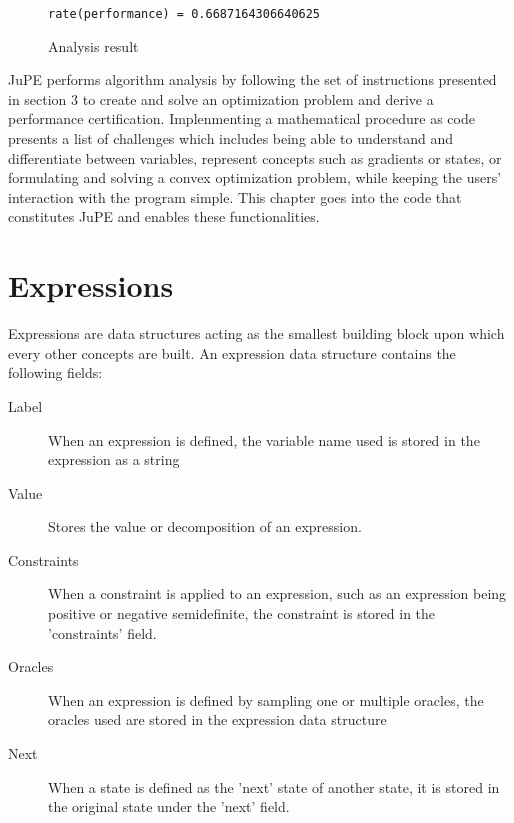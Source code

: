 \begin{figure}[hbtp]
    \caption{Analysis result}
    \label{ex_result}
\begin{lstlisting}
rate(performance) = 0.6687164306640625
\end{lstlisting}
\end{figure}

JuPE performs algorithm analysis by following the set of instructions presented in section 3 to create and solve an optimization problem and derive a performance certification. Implenmenting a mathematical procedure as code presents a list of challenges which includes being able to understand and differentiate between variables, represent concepts such as gradients or states, or formulating and solving a convex optimization problem, while keeping the users' interaction with the program simple. This chapter goes into the code that constitutes JuPE and enables these functionalities.

\section{Expressions}

Expressions are data structures acting as the smallest building block upon which every other concepts are built. An expression data structure contains the following fields:
\begin{description}
	\item[Label] When an expression is defined, the variable name used is stored in the expression as a string
	\item[Value] Stores the value or decomposition of an expression.
	\item[Constraints] When a constraint is applied to an expression, such as an expression being positive or negative semidefinite, the constraint is stored in the 'constraints' field.
	\item[Oracles] When an expression is defined by sampling one or multiple oracles, the oracles used are stored in the expression data structure
	\item[Next] When a state is defined as the 'next' state of another state, it is stored in the original state under the 'next' field.
 \end{description}


